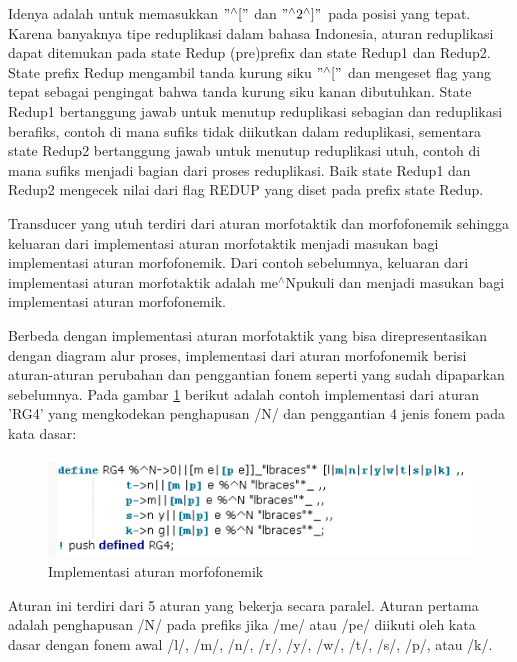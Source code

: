 Idenya adalah untuk memasukkan $"^{\wedge}["$ dan $"^{\wedge}2^{\wedge}]"$ pada posisi yang tepat. Karena banyaknya tipe reduplikasi dalam bahasa Indonesia, aturan reduplikasi dapat ditemukan pada state Redup (pre)prefix dan state Redup1 dan Redup2. State prefix Redup mengambil tanda kurung siku $"^{\wedge}["$ dan mengeset flag yang tepat sebagai pengingat bahwa tanda kurung siku kanan dibutuhkan. State Redup1 bertanggung jawab untuk menutup reduplikasi sebagian dan reduplikasi berafiks, contoh di mana sufiks tidak diikutkan dalam reduplikasi, sementara state Redup2 bertanggung jawab untuk menutup reduplikasi utuh, contoh di mana sufiks menjadi bagian dari proses reduplikasi. Baik state Redup1 dan Redup2 mengecek nilai dari flag REDUP yang diset pada prefix state Redup.

Transducer yang utuh terdiri dari aturan morfotaktik dan morfofonemik sehingga keluaran dari implementasi aturan morfotaktik menjadi masukan bagi implementasi aturan morfofonemik. Dari contoh sebelumnya, keluaran dari implementasi aturan morfotaktik adalah me$^{\wedge}$Npukuli dan menjadi masukan bagi implementasi aturan morfofonemik.

Berbeda dengan implementasi aturan morfotaktik yang bisa direpresentasikan dengan diagram alur proses, implementasi dari aturan morfofonemik berisi aturan-aturan perubahan dan penggantian fonem seperti yang sudah dipaparkan sebelumnya. Pada gambar \ref{gambar-implementasi-aturan-morfofonemik} berikut adalah contoh implementasi dari aturan 'RG4' yang mengkodekan penghapusan /N/ dan penggantian 4 jenis fonem pada kata dasar:

\begin{figure}[H]
\centering
\includegraphics[scale=0.6]{Gambar/gambar-implementasi-aturan-morfofonemik}
\caption[Implementasi aturan morfofonemik]{Implementasi aturan morfofonemik\cite{manurung:08:indonesian}} 
\label{gambar-implementasi-aturan-morfofonemik}
\end{figure}

Aturan ini terdiri dari 5 aturan yang bekerja secara paralel. Aturan pertama adalah penghapusan /N/ pada prefiks jika /me/ atau /pe/ diikuti oleh kata dasar dengan fonem awal /l/, /m/, /n/, /r/, /y/, /w/, /t/, /s/, /p/, atau /k/.

